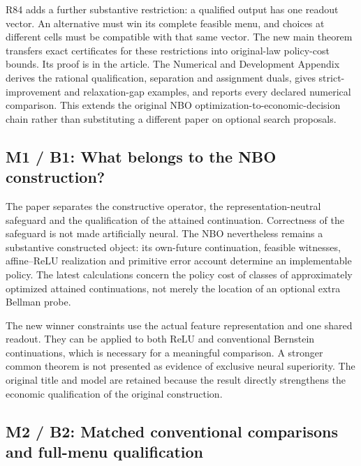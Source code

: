 \documentclass[ecta,nameyear,draft]{econsocart}
\begin{document}
R84 adds a further substantive restriction: a qualified output has one
readout vector. An alternative must win its complete feasible menu, and
choices at different cells must be compatible with that same vector. The
new main theorem transfers exact certificates for these restrictions
into original-law policy-cost bounds. Its proof is in the article. The
Numerical and Development Appendix derives the rational qualification,
separation and assignment duals, gives strict-improvement and
relaxation-gap examples, and reports every declared numerical
comparison. This extends the original NBO
optimization-to-economic-decision chain rather than substituting a
different paper on optional search proposals.

\hypertarget{m1-b1-what-belongs-to-the-nbo-construction}{%
\subsection{M1 / B1: What belongs to the NBO
construction?}\label{m1-b1-what-belongs-to-the-nbo-construction}}

The paper separates the constructive operator, the
representation-neutral safeguard and the qualification of the attained
continuation. Correctness of the safeguard is not made artificially
neural. The NBO nevertheless remains a substantive constructed object:
its own-future continuation, feasible witnesses, affine--ReLU
realization and primitive error account determine an implementable
policy. The latest calculations concern the policy cost of classes of
approximately optimized attained continuations, not merely the location
of an optional extra Bellman probe.

The new winner constraints use the actual feature representation and one
shared readout. They can be applied to both ReLU and conventional
Bernstein continuations, which is necessary for a meaningful comparison.
A stronger common theorem is not presented as evidence of exclusive
neural superiority. The original title and model are retained because
the result directly strengthens the economic qualification of the
original construction.

\hypertarget{m2-b2-matched-conventional-comparisons-and-full-menu-qualification}{%
\subsection{M2 / B2: Matched conventional comparisons and full-menu
qualification}\label{m2-b2-matched-conventional-comparisons-and-full-menu-qualification}}
\end{document}
